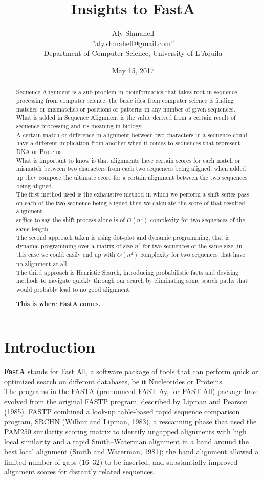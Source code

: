 \documentclass[12pt]{report}
\title{Insights to FastA}
\date{May 15, 2017}
\author{Aly Shmahell\\\hyperref[aly.shmahell@gmail.com]{''aly.shmahell@gmail.com''}\\ Department of Computer Science, University of L'Aquila}
\begin{document}
	\begin{abstract}
		Sequence Alignment is a sub-problem in bioinformatics that takes root in sequence processing from computer science, the basic idea from computer science is finding matches or mismatches or positions or patterns in any number of given sequences. \\
		What is added in Sequence Alignment is the value derived from a certain result of sequence processing and its meaning in biology.\\
		A certain match or difference in alignment between two characters in a sequence could have a different implication from another when it comes to sequences that represent DNA or Proteins.\\
		What is important to know is that alignments have certain scores for each match or mismatch between two characters from each two sequences being aligned, when added up they compose the ultimate score for a certain alignment between the two sequences being aligned.\\
		The first method used is the exhaustive method in which we perform a shift series pass on each of the two sequence being aligned then we calculate the score of that resulted alignment.\\
		suffice to say the shift process alone is of $ O(n^{2}) $ complexity for two sequences of the same length.\\
		The second approach taken is using dot-plot and dynamic programming, that is dynamic programming over a matrix of size $ n^{2} $ for two sequences of the same size. in this case we could easily end up with $ O(n^{2}) $ complexity for two sequences that have no alignment at all.\\
		The third approach is Heuristic Search, introducing probabilistic facts and devising methods to navigate quickly through our search by eliminating some search paths that would probably lead to no good alignment.\\
		\begin{center}
			\textbf{This is where FastA comes.}
		\end{center}
	\end{abstract}
	\newpage
	\section{\textbf{Introduction}}
	\textbf{FastA} stands for Fast All, a software package of tools that can perform quick or optimized search on different databases, be it Nucleotides or Proteins.\\
	The programs in the FASTA (pronounced FAST-Ay,
	for FAST-All) package have evolved from the original
	FASTP program, described by Lipman and Pearson
	(1985). FASTP combined a look-up table-based rapid
	sequence comparison program, SRCHN (Wilbur and
	Lipman, 1983), a rescanning phase that used the
	PAM250 similarity scoring matrix to identify
	ungapped alignments with high local similarity and a
	rapid Smith–Waterman alignment in a band around
	the best local alignment (Smith and Waterman, 1981);
	the band alignment allowed a limited number of gaps
	(16–32) to be inserted, and substantially improved
	alignment scores for distantly related sequences. \cite{Pearson}
\end{document}
